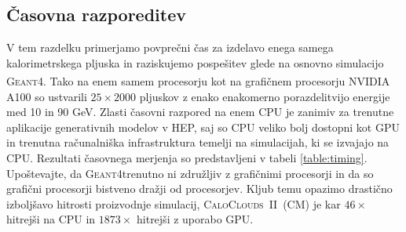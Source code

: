 \documentclass[12pt, a4paper]{article}
\newcommand{\geant}{\textsc{Geant4}\xspace \;}
\newcommand{\cccm}{\textsc{CaloClouds~II~(CM)}\xspace}
\begin{document}
\subsection{Časovna razporeditev}
\label{sec:Results_Timings}

V tem razdelku primerjamo povprečni čas za izdelavo enega samega kalorimetrsk\-ega pljuska in raziskujemo pospešitev glede na osnovno simulacijo \geant. Tako na enem samem procesorju kot na grafičnem procesorju NVIDIA\textsuperscript{\tiny\textregistered} A100 so ustvarili $25\times2000$ pljuskov z enako enakomerno porazdelitvijo energije med 10 in 90 GeV. Zlasti časovni razpored na enem CPU je zanimiv za trenutne aplikacije generativnih modelov v HEP, saj so CPU veliko bolj dostopni kot GPU in trenutna računalniška infrastruktura temelji na simulacijah, ki se izvajajo na CPU. Rezultati časovnega merjenja so predstavljeni v tabeli \ref{table:timing}. Upoštevajte, da \geant trenutno ni združljiv z grafičnimi procesorji in da so grafični procesorji bistveno dražji od procesorjev.
Kljub temu opazimo drastično izboljšavo hitrosti proizvodnje simulacij, \cccm je kar $46\times$ hitrejši na CPU in $1873\times$ hitrejši z uporabo GPU.
\end{document}
